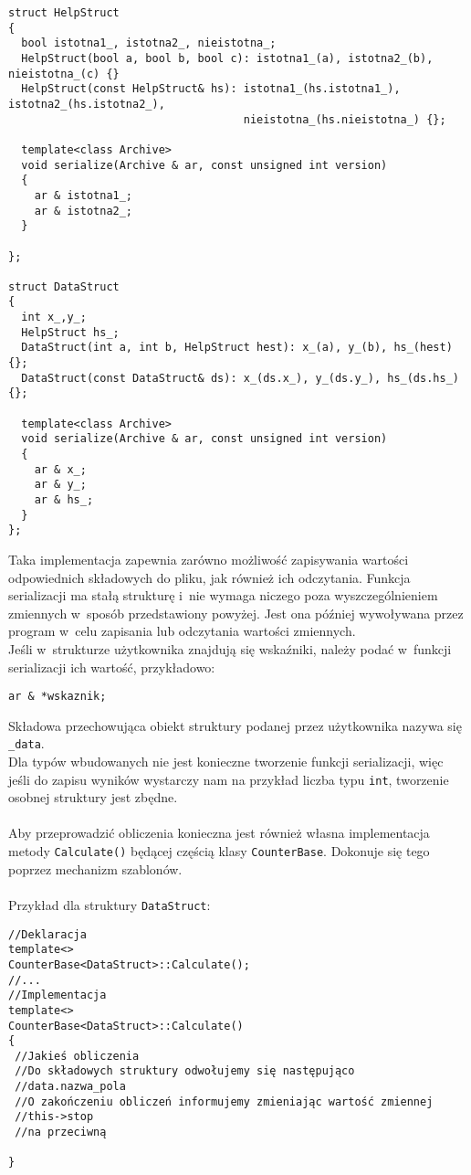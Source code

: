 \documentclass[a4paper]{article}
\begin{document}
\begin{verbatim}
struct HelpStruct
{
  bool istotna1_, istotna2_, nieistotna_;
  HelpStruct(bool a, bool b, bool c): istotna1_(a), istotna2_(b), nieistotna_(c) {}
  HelpStruct(const HelpStruct& hs): istotna1_(hs.istotna1_), istotna2_(hs.istotna2_), 
                                    nieistotna_(hs.nieistotna_) {};

  template<class Archive>
  void serialize(Archive & ar, const unsigned int version)
  {
    ar & istotna1_;
    ar & istotna2_;
  }
  
};

struct DataStruct
{
  int x_,y_;
  HelpStruct hs_;
  DataStruct(int a, int b, HelpStruct hest): x_(a), y_(b), hs_(hest) {};
  DataStruct(const DataStruct& ds): x_(ds.x_), y_(ds.y_), hs_(ds.hs_) {};

  template<class Archive>
  void serialize(Archive & ar, const unsigned int version)
  {
    ar & x_;
    ar & y_;
    ar & hs_;
  }
};

\end{verbatim}
Taka implementacja zapewnia zarówno możliwość zapisywania wartości odpowiednich składowych do pliku, jak również ich odczytania.
Funkcja serializacji ma stałą strukturę i~nie wymaga niczego poza wyszczególnieniem zmiennych w~sposób przedstawiony powyżej.
Jest ona później wywoływana przez program w~celu zapisania lub odczytania wartości zmiennych.\\
Jeśli w~strukturze użytkownika znajdują się wskaźniki, należy podać w~funkcji serializacji ich wartość, przykładowo:
\begin{verbatim}
ar & *wskaznik;
\end{verbatim}
Składowa przechowująca obiekt struktury podanej przez użytkownika nazywa się \texttt{\_data}.\\
Dla typów wbudowanych nie jest konieczne tworzenie funkcji serializacji, więc jeśli do zapisu wyników wystarczy nam na przykład liczba typu \texttt{int}, tworzenie osobnej struktury jest zbędne.\\
~\\
Aby przeprowadzić obliczenia konieczna jest również własna implementacja metody \texttt{Calculate()} będącej częścią klasy \texttt{CounterBase}. 
Dokonuje się tego poprzez mechanizm szablonów.\\
~\\
Przykład dla struktury \texttt{DataStruct}:
\begin{verbatim}
//Deklaracja
template<>
CounterBase<DataStruct>::Calculate();
//...
//Implementacja
template<>
CounterBase<DataStruct>::Calculate()
{
 //Jakieś obliczenia
 //Do składowych struktury odwołujemy się następująco
 //data.nazwa_pola
 //O zakończeniu obliczeń informujemy zmieniając wartość zmiennej
 //this->stop
 //na przeciwną

} 
\end{verbatim}
\end{document}
